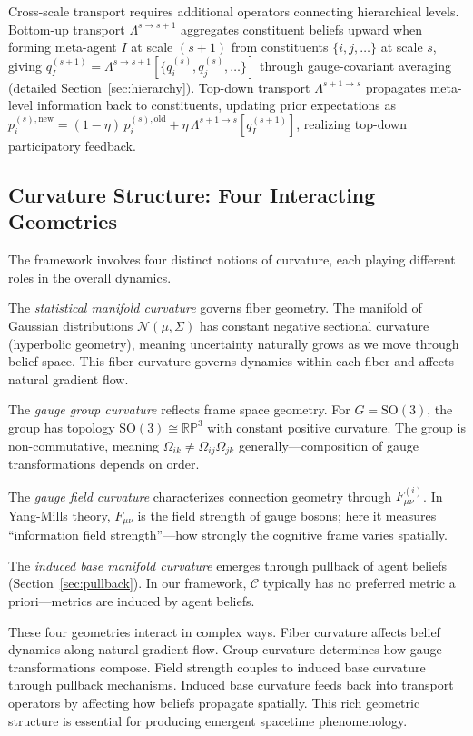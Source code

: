\documentclass[11pt]{article}
\begin{document}
Cross-scale transport requires additional operators connecting hierarchical levels. Bottom-up transport $\Lambda^{s \to s+1}$ aggregates constituent beliefs upward when forming meta-agent $I$ at scale $(s+1)$ from constituents $\{i,j,\ldots\}$ at scale $s$, giving $q_I^{(s+1)} = \Lambda^{s \to s+1}[\{q_i^{(s)}, q_j^{(s)}, \ldots\}]$ through gauge-covariant averaging (detailed Section~\ref{sec:hierarchy}). Top-down transport $\Lambda^{s+1 \to s}$ propagates meta-level information back to constituents, updating prior expectations as $p_i^{(s),\text{new}} = (1-\eta)\,p_i^{(s),\text{old}} + \eta\,\Lambda^{s+1 \to s}[q_I^{(s+1)}]$, realizing top-down participatory feedback.

\subsection{Curvature Structure: Four Interacting Geometries}

The framework involves four distinct notions of curvature, each playing different roles in the overall dynamics.

The \emph{statistical manifold curvature} governs fiber geometry. The manifold of Gaussian distributions $\mathcal{N}(\mu, \Sigma)$ has constant negative sectional curvature (hyperbolic geometry), meaning uncertainty naturally grows as we move through belief space. This fiber curvature governs dynamics within each fiber and affects natural gradient flow.

The \emph{gauge group curvature} reflects frame space geometry. For $G = \mathrm{SO}(3)$, the group has topology $\mathrm{SO}(3) \cong \mathbb{RP}^3$ with constant positive curvature. The group is non-commutative, meaning $\Omega_{ik} \neq \Omega_{ij}\Omega_{jk}$ generally---composition of gauge transformations depends on order.

The \emph{gauge field curvature} characterizes connection geometry through $F^{(i)}_{\mu\nu}$. In Yang-Mills theory, $F_{\mu\nu}$ is the field strength of gauge bosons; here it measures ``information field strength''---how strongly the cognitive frame varies spatially.

The \emph{induced base manifold curvature} emerges through pullback of agent beliefs (Section~\ref{sec:pullback}). In our framework, $\mathcal{C}$ typically has no preferred metric a priori---metrics are induced by agent beliefs.

These four geometries interact in complex ways. Fiber curvature affects belief dynamics along natural gradient flow. Group curvature determines how gauge transformations compose. Field strength couples to induced base curvature through pullback mechanisms. Induced base curvature feeds back into transport operators by affecting how beliefs propagate spatially. This rich geometric structure is essential for producing emergent spacetime phenomenology.
\end{document}
